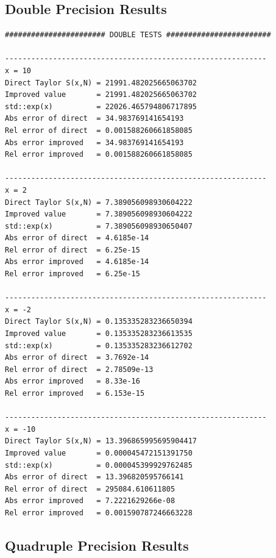 \documentclass[12pt,a4paper]{article}
\begin{document}
\subsection*{Double Precision Results}

\begin{lstlisting}
####################### DOUBLE TESTS ########################

------------------------------------------------------------
x = 10
Direct Taylor S(x,N) = 21991.482025665063702
Improved value       = 21991.482025665063702
std::exp(x)          = 22026.465794806717895
Abs error of direct  = 34.983769141654193
Rel error of direct  = 0.001588260661858085
Abs error improved   = 34.983769141654193
Rel error improved   = 0.001588260661858085

------------------------------------------------------------
x = 2
Direct Taylor S(x,N) = 7.389056098930604222
Improved value       = 7.389056098930604222
std::exp(x)          = 7.389056098930650407
Abs error of direct  = 4.6185e-14
Rel error of direct  = 6.25e-15
Abs error improved   = 4.6185e-14
Rel error improved   = 6.25e-15

------------------------------------------------------------
x = -2
Direct Taylor S(x,N) = 0.135335283236650394
Improved value       = 0.135335283236613535
std::exp(x)          = 0.135335283236612702
Abs error of direct  = 3.7692e-14
Rel error of direct  = 2.78509e-13
Abs error improved   = 8.33e-16
Rel error improved   = 6.153e-15

------------------------------------------------------------
x = -10
Direct Taylor S(x,N) = 13.396865995695904417
Improved value       = 0.000045472151391750
std::exp(x)          = 0.000045399929762485
Abs error of direct  = 13.396820595766141
Rel error of direct  = 295084.610611805
Abs error improved   = 7.2221629266e-08
Rel error improved   = 0.001590787246663228
\end{lstlisting}

\subsection*{Quadruple Precision Results}
\end{document}
